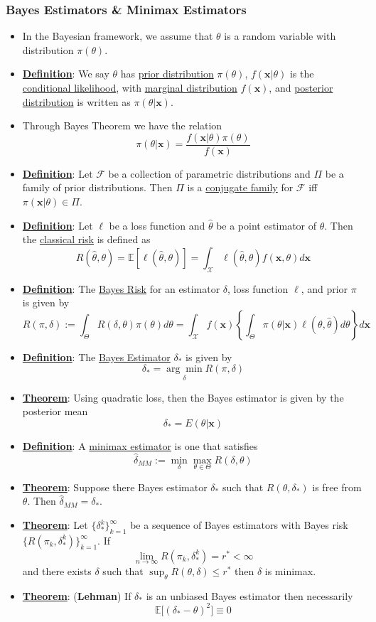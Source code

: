\documentclass{article}
\newcommand{\E}{{\mathbb{E}}}
\newcommand{\x}{{\textbf{x}}}
\begin{document}
\subsubsection{Bayes Estimators \& Minimax Estimators}
\begin{itemize}
	\item In the Bayesian framework, we assume that $\theta$ is a random variable with distribution $\pi(\theta)$.
	\item \underline{\textbf{Definition}}: We say $\theta$ has \underline{prior distribution} $\pi(\theta)$, $f(\x|\theta)$ is the \underline{conditional likelihood}, with \underline{marginal distribution} $f(\x)$, and \underline{posterior distribution} is written as $\pi(\theta|\x)$. 
	\item Through Bayes Theorem we have the relation $$\pi(\theta|\x) = \frac{f(\x|\theta)\pi(\theta)}{f(\x)}$$
	\item \underline{\textbf{Definition}}: Let $\mathcal{F}$ be a collection of parametric distributions and $\Pi$ be a family of prior distributions. Then $\Pi$ is a \underline{conjugate family} for $\mathcal{F}$ iff $\pi(\x|\theta)\in \Pi$. 
	\item \underline{\textbf{Definition}}: Let $\ell$ be a loss function and $\hat{\theta}$ be a point estimator of $\theta$. Then the \underline{classical risk} is defined as $$R(\hat{\theta},\theta) = \E[\ell(\hat{\theta},\theta)] = \int_{\mathcal{X}} \ell(\hat{\theta}, \theta)f(\x,\theta)d\x$$
	\item \underline{\textbf{Definition}}: The \underline{Bayes Risk} for an estimator $\delta$, loss function $\ell$, and prior $\pi$ is given by $$R(\pi,\delta):= \int_{\Theta} R(\delta, \theta)\pi(\theta)d\theta = \int_{\mathcal{X}}f(\x)\left\{\int_{\Theta}\pi(\theta|\x)\ell(\theta, \hat{\theta})d\theta\right\}d\x$$
	\item \underline{\textbf{Definition}}: The \underline{Bayes Estimator} $\delta_*$ is given by $$\delta_* = \underset{\delta}{\arg\min}R(\pi, \delta)$$
	\item \underline{\textbf{Theorem}}: Using quadratic loss, then the Bayes estimator is given by the posterior mean $$\delta_* = E(\theta|\x)$$
	\item \underline{\textbf{Definition}}: A \underline{minimax estimator} is one that satisfies $$\hat{\delta}_{MM} := \underset{\delta}{\min}\underset{\theta\in\Theta}{\max}R(\delta,\theta)$$
	\item \underline{\textbf{Theorem}}: Suppose there Bayes estimator $\delta_*$ such that $R(\theta, \delta_*)$ is free from $\theta$. Then $\hat{\delta}_{MM} = \delta_*$. 
	\item \underline{\textbf{Theorem}}: Let $\{\delta_*^k\}_{k=1}^{\infty}$ be a sequence of Bayes estimators with Bayes risk $\{R(\pi_k,\delta_*^k)\}_{k=1}^{\infty}$. If $$\lim_{n\to\infty}R(\pi_k, \delta_*^k) = r^*<\infty$$ and there exists $\delta$ such that $\sup_{\theta}R(\theta, \delta)\leq r^{*}$ then $\delta$ is minimax. 
	\item \underline{\textbf{Theorem}}: (\textbf{Lehman}) If $\delta_*$ is an unbiased Bayes estimator then necessarily $$\E\Big[(\delta_* - \theta)^2\Big]\equiv 0 $$
\end{itemize}
\end{document}
